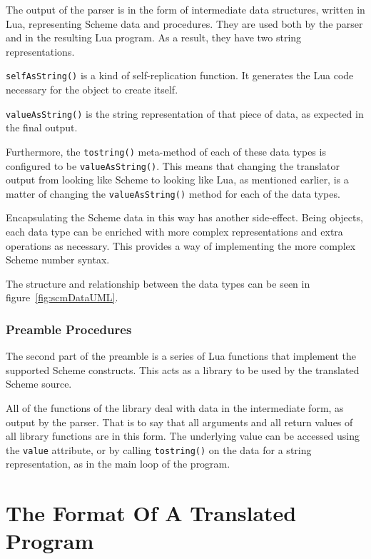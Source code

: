 The output of the parser is in the form of intermediate data structures, written
in Lua, representing Scheme data and procedures. They are used both by the
parser and in the resulting Lua program. As a result, they have two
string representations.
\begin{description}
\item \texttt{selfAsString()} is a kind of self-replication function. It
generates the Lua code necessary for the object to create itself.
\item \texttt{valueAsString()} is the string representation of that piece of
data, as expected in the final output.
\end{description}
Furthermore, the \texttt{tostring()} meta-method of each of these data types is
configured to be \texttt{valueAsString()}. This means that changing the
translator output from looking like Scheme to looking like Lua, as mentioned
earlier, is a matter of changing the \texttt{valueAsString()} method for each of
the data types.

Encapsulating the Scheme data in this way has another side-effect. Being
objects, each data type can be enriched with more complex representations and
extra operations as necessary. This provides a way of implementing the more
complex Scheme number syntax.

The structure and relationship between the data types can be seen in
figure~\ref{fig:scmDataUML}.

\subsubsection{Preamble Procedures}

The second part of the preamble is a series of Lua functions that implement the
supported Scheme constructs. This acts as a library to be used by the
translated Scheme source.

All of the functions of the library deal with data in the intermediate form, as
output by the parser. That is to say that all arguments and all return values of
all library functions are in this form. The underlying value can be accessed
using the \texttt{value} attribute, or by calling \texttt{tostring()} on the
data for a string representation, as in the main loop of the program.


\section{The Format Of A Translated Program}

